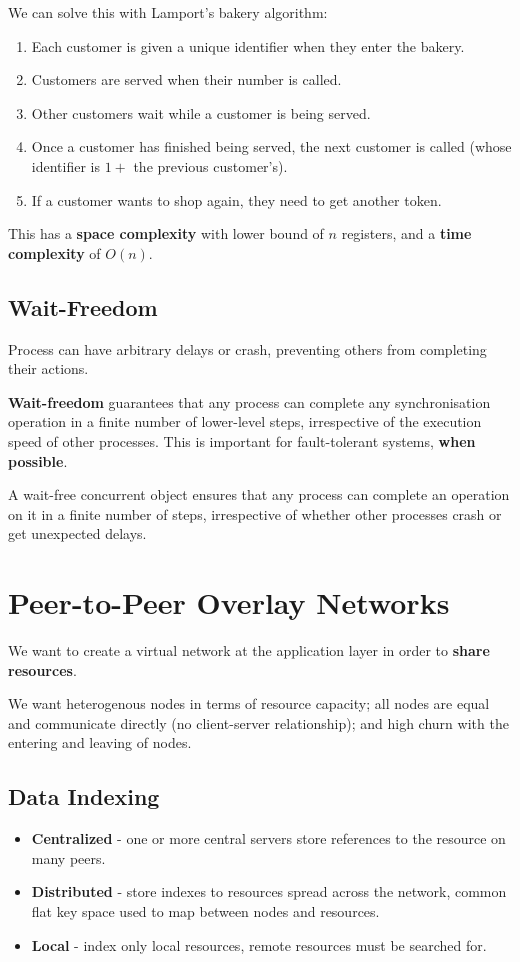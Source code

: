 \documentclass[11pt]{article}
\begin{document}
We can solve this with Lamport's bakery algorithm:
\begin{enumerate}
  \item Each customer is given a unique identifier when they enter the bakery.
  \item Customers are served when their number is called.
  \item Other customers wait while a customer is being served.
  \item Once a customer has finished being served, the next customer is called (whose identifier is $1 +$ the previous customer's).
  \item If a customer wants to shop again, they need to get another token.
\end{enumerate}

This has a \textbf{space complexity} with lower bound of $n$ registers, and a \textbf{time complexity} of $O(n)$.

\subsection{Wait-Freedom}
Process can have arbitrary delays or crash, preventing others from completing their actions.

\textbf{Wait-freedom} guarantees that any process can complete any synchronisation operation in a finite number of lower-level steps, irrespective of the execution speed of other processes.
This is important for fault-tolerant systems, \textbf{when possible}.

A wait-free concurrent object ensures that any process can complete an operation on it in a finite number of steps, irrespective of whether other processes crash or get unexpected delays.

\section{Peer-to-Peer Overlay Networks}
We want to create a virtual network at the application layer in order to \textbf{share resources}.

We want heterogenous nodes in terms of resource capacity; all nodes are equal and communicate directly (no client-server relationship); and high churn with the entering and leaving of nodes.

\subsection{Data Indexing}
\begin{itemize}
  \item \textbf{Centralized} - one or more central servers store references to the resource on many peers.
  \item \textbf{Distributed} - store indexes to resources spread across the network, common flat key space used to map between nodes and resources.
  \item \textbf{Local} - index only local resources, remote resources must be searched for.
\end{itemize}
\end{document}

